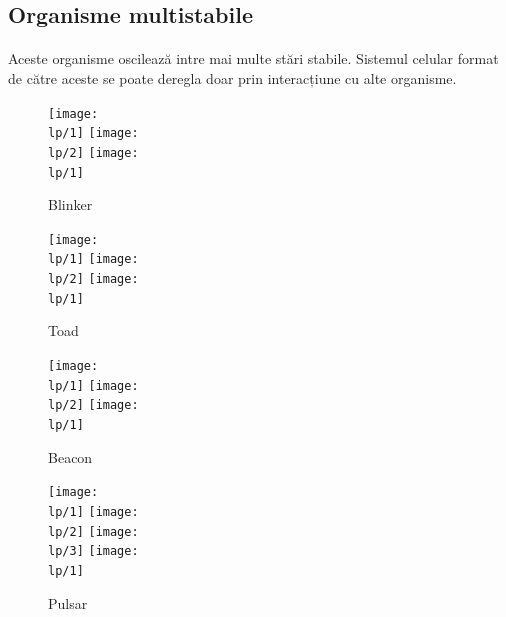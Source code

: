 \documentclass[11pt ,A4]{article}
\begin{document}
            \subsection{Organisme multistabile}
                    
                    \paragraph{}
                        Aceste organisme oscilează intre mai multe stări stabile.
                        Sistemul celular format de către aceste se poate deregla doar prin interacțiune cu alte organisme.

                    \begin{figure}[H]
                        \newcommand\lp{organisme/oscilante/1-blinker}
                        \centering
                        \texttt{[image: \\lp/1]}
                        \texttt{[image: \\lp/2]}
                        \texttt{[image: \\lp/1]}
                        \caption{Blinker}
                    \end{figure}

                    \begin{figure}[H]
                        \newcommand\lp{organisme/oscilante/2-toad}
                        \centering
                        \texttt{[image: \\lp/1]}
                        \texttt{[image: \\lp/2]}
                        \texttt{[image: \\lp/1]}
                        \caption{Toad}
                    \end{figure}
                    
                    \begin{figure}[H]
                        \newcommand\lp{organisme/oscilante/3-beacon}
                        \centering
                        \texttt{[image: \\lp/1]}
                        \texttt{[image: \\lp/2]}
                        \texttt{[image: \\lp/1]}
                        \caption{Beacon}
                    \end{figure}
                    
                    \begin{figure}[H]
                        \newcommand\lp{organisme/oscilante/4-pulsar}
                        \centering
                        \texttt{[image: \\lp/1]}
                        \texttt{[image: \\lp/2]}
                        \texttt{[image: \\lp/3]}
                        \texttt{[image: \\lp/1]}
                        \caption{Pulsar}
                    \end{figure}
\end{document}
